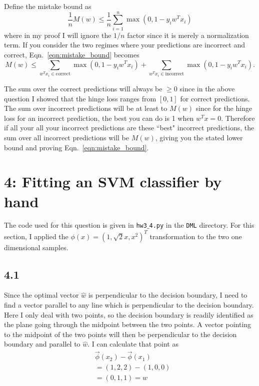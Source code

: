 \documentclass[12pt]{amsart}
\begin{document}
Define the mistake bound as
\begin{equation} \label{eqn:mistake_bound}
\frac{1}{n}M(w) \leq \frac{1}{n}\sum_{i = 1}^n \max(0, 1 - y_i w^T x_i)
\end{equation}
where in my proof I will ignore the $1/n$ factor since it is merely a normalization term.  If you consider the two regimes where your predictions are incorrect and correct, Eqn.~\ref{eqn:mistake_bound} becomes
\begin{equation} \label{eqn:mb} 
M(w) \leq \sum_{w^Tx_i \in \text{correct}} \max(0, 1 - y_i w^T x_i) + \sum_{w^Tx_i \in \text{incorrect}} \max(0, 1 - y_i w^T x_i).
\end{equation}

The sum over the correct predictions will always be $\geq 0$ since in the above question I showed that the hinge loss ranges from $[0,1]$ for correct predictions.  The sum over incorrect predictions will be at least to $M(w)$ since for the hinge loss for an incorrect prediction, the best you can do is 1 when $w^Tx = 0$.  Therefore if all your all your incorrect predictions are these ``best" incorrect predictions, the sum over all incorrect predictions will be $M(w)$, giving you the stated lower bound and proving Eqn.~\ref{eqn:mistake_bound}.  

\section*{4: Fitting an SVM classifier by hand}

The code used for this question is given in {\tt hw3$\_$4.py} in the {\tt DML} directory.  For this section, I applied the $\phi(x) = (1, \sqrt{2}x, x^2)^T$ transformation to the two one dimensional samples.

\subsection*{4.1}

Since the optimal vector $\hat{w}$ is perpendicular to the decision boundary, I need to find a vector parallel to any line which is perpendicular to the decision boundary.  Here I only deal with two points, so the decision boundary is readily identified as the plane going through the midpoint between the two points.  A vector pointing to the midpoint of the two points will then be perpendicular to the decision boundary and parallel to $\hat{w}$.  I can calculate that point as 
\begin{equation}
\begin{split}
& \vec{\phi}(x_2) - \vec{\phi}(x_1) \\
& = (1,2,2) - (1,0,0) \\
& = (0,1,1) = w
\end{split}
\end{equation}
\end{document}
